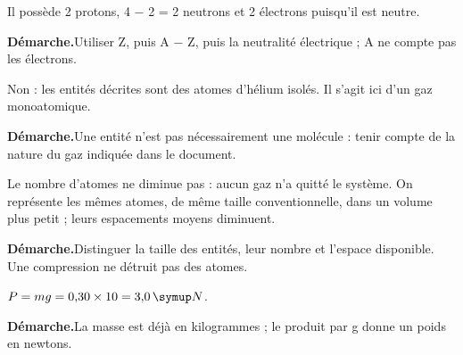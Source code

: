 \label{cor-ann-15}
\par\noindent\begin{minipage}{\linewidth}Il possède 2 protons, 4 − 2 = 2 neutrons et 2 électrons puisqu’il est neutre.\par\smallskip\textbf{Démarche.}\enspace Utiliser Z, puis A − Z, puis la neutralité électrique ; A ne compte pas les électrons.\par{}\end{minipage}\par
\par\noindent\begin{minipage}{\linewidth}Non : les entités décrites sont des atomes d’hélium isolés. Il s’agit ici d’un gaz monoatomique.\par\smallskip\textbf{Démarche.}\enspace Une entité n’est pas nécessairement une molécule : tenir compte de la nature du gaz indiquée dans le document.\par{}\end{minipage}\par
\par\noindent\begin{minipage}{\linewidth}Le nombre d’atomes ne diminue pas : aucun gaz n’a quitté le système. On représente les mêmes atomes, de même taille conventionnelle, dans un volume plus petit ; leurs espacements moyens diminuent.\par\smallskip\textbf{Démarche.}\enspace Distinguer la taille des entités, leur nombre et l’espace disponible. Une compression ne détruit pas des atomes.\par{}\end{minipage}\par
{}
\par\noindent\begin{minipage}{\linewidth}$P=mg=0{,}30\times10=3{,}0\unite N$.\par\smallskip\textbf{Démarche.}\enspace La masse est déjà en kilogrammes ; le produit par g donne un poids en newtons.\par{}\end{minipage}\par
